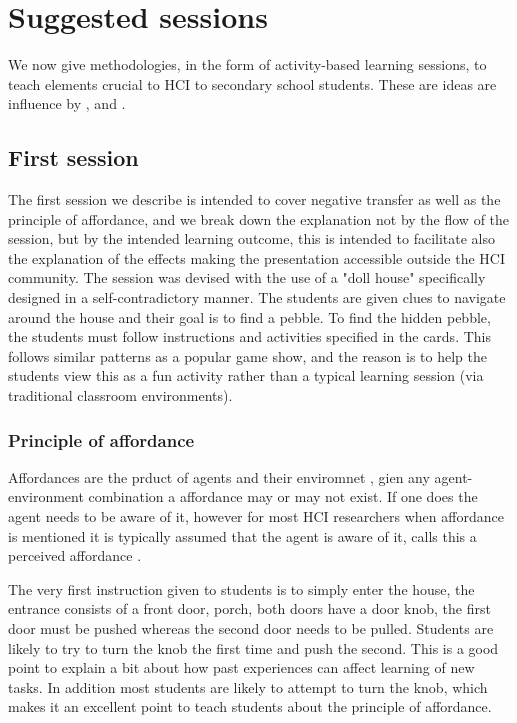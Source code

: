 \documentclass{sig-alternate}
\begin{document}
 
\section{Suggested sessions}
We now give methodologies, in the form of activity-based learning sessions, to teach elements crucial to HCI to secondary school students. These are ideas are influence by \cite{normanDesign}, \cite{rogers2011interaction} and \cite{shneiderman1986designing}.
\subsection{First session}
The first session we describe is intended to cover negative transfer as well as the principle of affordance, and we break down the explanation not by the flow of the session, but by the intended learning outcome, this is intended to facilitate also the explanation of the effects making the presentation accessible outside the HCI community. The session was devised with the use of a "doll house" specifically designed in a self-contradictory manner. The students are given clues to navigate around the house and their goal is to find a pebble. To find the hidden pebble, the students must follow instructions and activities specified in the cards. This follows similar patterns as a popular game show, and the reason is to help the students view this as a fun activity rather than a typical learning session (via traditional classroom environments).

\subsubsection*{Principle of affordance}
Affordances are the prduct of agents and their enviromnet \cite{gibson1977theory}, gien any agent-environment combination a affordance may or may not exist. If one does the agent needs to be aware of it, however for most HCI researchers when affordance is mentioned it is typically assumed that the agent is aware of it,  calls this a perceived affordance \cite{norman1999affordance}.

The very first instruction given to students is to simply enter the house, the entrance consists of a front door, porch, both doors have a door knob, the first door must be pushed whereas the second door needs to be pulled. Students are likely to try to turn the knob the first time and push the second. This is a good point to explain a bit about how past experiences can affect learning of new tasks. In addition most students are likely to attempt to turn the knob, which makes it an excellent point to teach students about the principle of affordance. 
\end{document}
